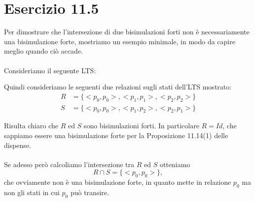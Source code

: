 \section*{Esercizio 11.5}

    
    Per dimostrare che l'intersezione di due bisimulazioni forti non è necessariamente una bisimulazione forte, mostriamo un esempio minimale, in modo da capire meglio quando ciò accade.\\
    \\
    Consideriamo il seguente LTS:
        
    \begin{center}
    \end{center}
    
    Quindi consideriamo le seguenti due relazioni sugli stati dell'LTS mostrato:
    \begin{align*}
        R &= \{<p_0,p_0>, <p_1,p_1>, <p_2, p_2>\}\\
        S &= \{<p_0,p_0>, <p_1,p_2>, <p_2, p_1>\}
    \end{align*}
    
    Risulta chiaro che $R$ ed $S$ sono bisimulazioni forti. In particolare $R=Id$, che sappiamo essere una bisimulazione forte per la Proposizione 11.14(1) delle dispense.\\
    \\
    Se adesso però calcoliamo l'intersezione tra $R$ ed $S$ otteniamo
    \begin{equation*}
        R \cap S = \{<p_0,p_0>\},
    \end{equation*}
    che ovviamente non è una bisimulazione forte, in quanto mette in relazione $p_0$ ma non gli stati in cui $p_0$ può transire.
